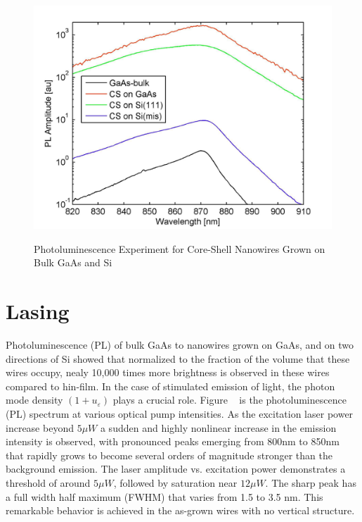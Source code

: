 \begin{figure}
  \caption{Photoluminescence Experiment for Core-Shell Nanowires Grown on Bulk GaAs and Si}
  \centering
  \includegraphics[width=\textwidth]{pictures/Data/PL}
  \label{PL}
\end{figure}

\section{Lasing} \label{BH_data}

Photoluminescence (PL) of bulk GaAs to nanowires grown on GaAs, and on two
directions of Si showed that normalized to the fraction of the volume that
these wires occupy, nealy 10,000 times more brightness is observed in these
wires compared to hin-film. In the case of stimulated emission of light, the
photon mode density $(1+u_\varepsilon)$ plays a crucial role. Figure ~\cite{}
is the photoluminescence (PL) spectrum at various optical pump intensities. As
the excitation laser power increase beyond $5{\mu}W$ a sudden and highly
nonlinear increase in the emission intensity is observed, with pronounced peaks
emerging from 800nm to 850nm that rapidly grows to become several orders of
magnitude stronger than the background emission. The laser amplitude vs.
excitation power demonstrates a threshold of around $5{\mu}W$, followed by
saturation near $12{\mu}W$. The sharp peak has a full width half maximum
(FWHM) that varies from 1.5 to 3.5 nm. This remarkable behavior is achieved in
the as-grown wires with no vertical structure.

